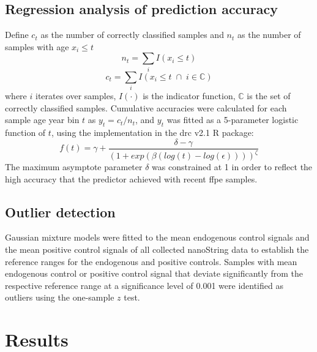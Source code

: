 \subsection{Regression analysis of prediction accuracy}

Define $c_t$ as the number of correctly classified samples and $n_t$ as the number of samples with age $x_i \le t$
\[
n_t = \sum_i I(x_i \le t)
\]
\[
c_t = \sum_i I(x_i \le t \; \cap \; i \in \mathbb{C})
\]
where $i$ iterates over samples, $I(\cdot)$ is the indicator function, $\mathbb{C}$ is the set of correctly classified samples.
Cumulative accuracies were calculated for each sample age year bin $t$ as $y_t = c_t / n_t$, and $y_t$ was fitted as a 5-parameter logistic function of $t$, using the implementation in the drc v2.1 R package:
\[
f(t) = \gamma + \frac{\delta - \gamma}{(1 + exp( \beta (log(t) - log(\epsilon)) ))^\zeta}
\]
The maximum asymptote parameter $\delta$ was constrained at 1 in order to reflect the high accuracy that the predictor achieved with recent \gls{ffpe} samples. 

\subsection{Outlier detection}

Gaussian mixture models were fitted to the mean endogenous control signals and the mean positive control signals of all collected nanoString data to establish the reference ranges for the endogenous and positive controls. Samples with mean endogenous control or positive control signal that deviate significantly from the respective reference range at a significance level of 0.001 were identified as outliers using the one-sample $z$ test.

\section{Results}

